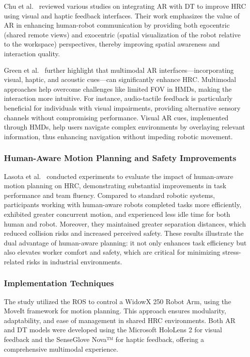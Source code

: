 Chu et al.~\cite{CHU2023313} reviewed various studies on integrating \ac{AR} with \ac{DT} to improve \ac{HRC} using visual and haptic feedback interfaces. Their work emphasizes the value of \ac{AR} in enhancing human-robot communication by providing both egocentric (shared remote views) and exocentric (spatial visualization of the robot relative to the workspace) perspectives, thereby improving spatial awareness and interaction quality. 

Green et al.~\cite{doi:10.5772/5664} further highlight that multimodal \ac{AR} interfaces—incorporating visual, haptic, and acoustic cues—can significantly enhance \ac{HRC}. Multimodal approaches help overcome challenges like limited \ac{FOV} in \ac{HMDs}, making the interaction more intuitive. For instance, audio-tactile feedback is particularly beneficial for individuals with visual impairments, providing alternative sensory channels without compromising performance. Visual \ac{AR} cues, implemented through \ac{HMDs}, help users navigate complex environments by overlaying relevant information, thus enhancing navigation without impeding robotic movement.

\subsubsection{Human-Aware Motion Planning and Safety Improvements}

Lasota et al.~\cite{doi:10.1177/0018720814565188} conducted experiments to evaluate the impact of human-aware motion planning on \ac{HRC}, demonstrating substantial improvements in task performance and team fluency. Compared to standard robotic systems, participants working with human-aware robots completed tasks more efficiently, exhibited greater concurrent motion, and experienced less idle time for both human and robot. Moreover, they maintained greater separation distances, which reduced collision risks and increased perceived safety. These results illustrate the dual advantage of human-aware planning: it not only enhances task efficiency but also elevates worker comfort and safety, which are critical for minimizing stress-related risks in industrial environments.

\subsubsection{Implementation Techniques}

The study utilized the \ac{ROS} to control a WidowX 250 Robot Arm, using the MoveIt framework for motion planning. This approach ensures modularity, adaptability, and ease of management in shared \ac{HRC} environments. Both \ac{AR} and \ac{DT} models were developed using the Microsoft HoloLens 2 for visual feedback and the SenseGlove Nova™ for haptic feedback, offering a comprehensive multimodal experience.

